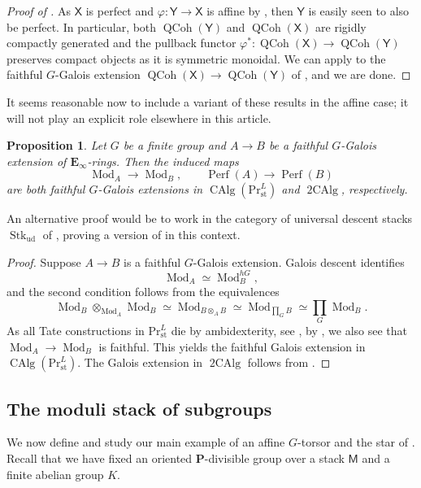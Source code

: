 \documentclass[11pt, a4paper]{article}
\newcommand{\st}{\mathrm{st}}
\newcommand{\ud}{\mathrm{ud}}
\newcommand{\1}{\mathbf{1}}
\DeclareMathOperator{\CAlg}{CAlg}
\DeclareMathOperator{\tworing}{2CAlg}
\newcommand{\PrLst}{{\mathrm{Pr}^L_\st}}
\DeclareMathOperator{\Mod}{Mod}
\DeclareMathOperator{\Perf}{Perf}
\DeclareMathOperator{\QCoh}{QCoh}
\DeclareMathOperator{\Stk}{Stk}
\newcommand{\E}{\mathbf{E}}
\newcommand{\M}{\mathsf{M}}
\renewcommand{\P}{\mathbf{P}}
\newcommand{\X}{\mathsf{X}}
\newcommand{\Y}{\mathsf{Y}}
\theoremstyle{plain}
\newtheorem{prop}[equation]{Proposition}
\theoremstyle{definition}
\theoremstyle{remark}\numberwithin{equation}{section}
\begin{document}
\begin{proof}[Proof of ]
    As $\X$ is perfect and $\varphi\colon \Y \to \X$ is affine by , then $\Y$ is easily seen to also be perfect. In particular, both $\QCoh(\Y)$ and $\QCoh(\X)$ are rigidly compactly generated and the pullback functor $\varphi^\ast \colon \QCoh(\X) \to \QCoh(\Y)$ preserves compact objects as it is symmetric monoidal. We can apply  to the faithful $G$-Galois extension $\QCoh(\X) \to \QCoh(\Y)$ of , and we are done.
\end{proof}

It seems reasonable now to include a variant of these results in the affine case; it will not play an explicit role elsewhere in this article.

\begin{prop}\label{pr:mod_and_perf_preserve_Galois}
    Let $G$ be a finite group and $A \to B$ be a faithful $G$-Galois extension of $\E_\infty$-rings. Then the induced maps
    \[\Mod_A \to \Mod_B, \qquad \Perf(A) \to \Perf(B)\]
    are both faithful $G$-Galois extensions in $\CAlg(\PrLst)$ and $\tworing$, respectively.
\end{prop}

An alternative proof would be to work in the category of universal descent stacks $\Stk_\ud$ of , proving a version of  in this context.

\begin{proof}
    Suppose $A \to B$ is a faithful $G$-Galois extension. Galois descent \cite[Thm.9.4]{mathew_Galois} identifies
    \[\Mod_A \simeq \Mod_B^{hG},\]
    and the second condition follows from the equivalences
    \[\Mod_B \otimes_{\Mod_A} \Mod_B \simeq \Mod_{B\otimes_A B} \simeq \Mod_{\prod_G B} \simeq \prod_G \Mod_B.\]
    As all Tate constructions in $\PrLst$ die by ambidexterity, see \cite[Pr.2.26]{categorical_ambidexterity_shay}, by \cite[Pr.6.3.3]{johnrognessdualisinggorups}, we also see that $\Mod_A \to \Mod_B$ is faithful. This yields the faithful Galois extension in $\CAlg(\PrLst)$. The Galois extension in $\tworing$ follows from .
\end{proof}

\subsection{The moduli stack of subgroups}\label{ssec:construction_of_moduli}
We now define and study our main example of an affine $G$-torsor and the star of . Recall that we have fixed an oriented $\P$-divisible group over a stack $\M$ and a finite abelian group $K$.
\end{document}
